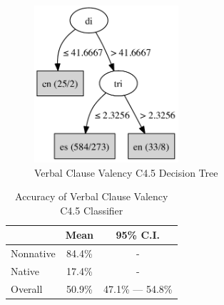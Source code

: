 \documentclass[main.tex]{subfiles}
\begin{document}
\begin{figure}[ht]
\centering
\includegraphics[width=2.1in]{c45-val.pdf}
\caption{Verbal Clause Valency C4.5 Decision Tree}
\label{fig:c4.5-val}
\end{figure}

\begin{table}[ht]
\centering
\caption{Accuracy of Verbal Clause Valency C4.5 Classifier}
\begin{tabular}{l c c}
\toprule
& Mean & 95\% C.I.\\
\midrule
Nonnative & 84.4\% & - \\
[6pt]Native & 17.4\% & - \\
[6pt]Overall & 50.9\% & 47.1\% --- 54.8\% \\
\bottomrule
\end{tabular}
\label{table:val-results}
\end{table}
\end{document}
